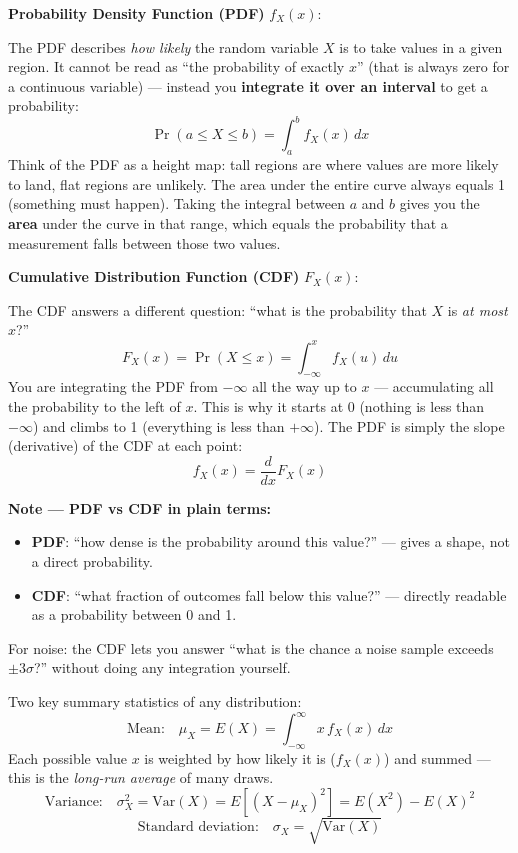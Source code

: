 \documentclass[12pt, a4paper]{article}
\begin{document}
\textbf{Probability Density Function (PDF)} $f_X(x)$:

The PDF describes \emph{how likely} the random variable $X$ is to take
values in a given region. It cannot be read as ``the probability of
exactly $x$'' (that is always zero for a continuous variable) --- instead
you \textbf{integrate it over an interval} to get a probability:
\[
  \Pr(a \leq X \leq b) = \int_a^b f_X(x)\,dx
\]
Think of the PDF as a height map: tall regions are where values are
more likely to land, flat regions are unlikely. The area under the
entire curve always equals 1 (something must happen).
Taking the integral between $a$ and $b$ gives you the \textbf{area}
under the curve in that range, which equals the probability that a
measurement falls between those two values.

\textbf{Cumulative Distribution Function (CDF)} $F_X(x)$:

The CDF answers a different question: ``what is the probability that
$X$ is \emph{at most} $x$?''
\[
  F_X(x) = \Pr(X \leq x) = \int_{-\infty}^{x} f_X(u)\,du
\]
You are integrating the PDF from $-\infty$ all the way up to $x$ ---
accumulating all the probability to the left of $x$. This is why it
starts at 0 (nothing is less than $-\infty$) and climbs to 1 (everything
is less than $+\infty$). The PDF is simply the slope (derivative) of
the CDF at each point:
\[
  f_X(x) = \frac{d}{dx}F_X(x)
\]

\begin{notebox}
  \textbf{Note --- PDF vs CDF in plain terms:}
  \begin{itemize}[leftmargin=1.5em, topsep=2pt]
    \item \textbf{PDF}: ``how dense is the probability around this value?''
          --- gives a shape, not a direct probability.
    \item \textbf{CDF}: ``what fraction of outcomes fall below this value?''
          --- directly readable as a probability between 0 and 1.
  \end{itemize}
  For noise: the CDF lets you answer ``what is the chance a noise
  sample exceeds $\pm 3\sigma$?'' without doing any integration yourself.
\end{notebox}

Two key summary statistics of any distribution:
\[
  \text{Mean:} \quad
  \mu_X = E(X) = \int_{-\infty}^{\infty} x\, f_X(x)\,dx
\]
Each possible value $x$ is weighted by how likely it is ($f_X(x)$)
and summed --- this is the \emph{long-run average} of many draws.
\[
  \text{Variance:} \quad
  \sigma_X^2 = \mathrm{Var}(X) = E\!\left[(X-\mu_X)^2\right]
             = E(X^2) - E(X)^2
\]
\[
  \text{Standard deviation:} \quad \sigma_X = \sqrt{\mathrm{Var}(X)}
\]
\end{document}
